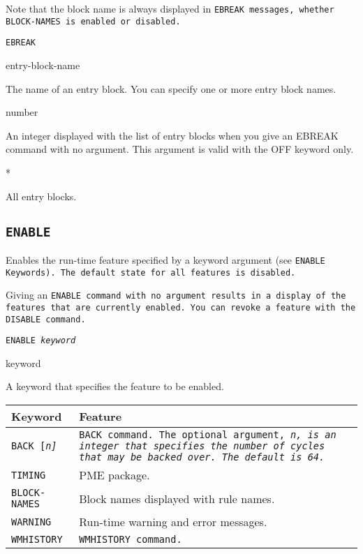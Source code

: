 Note that the block name is always displayed in \tt{EBREAK} messages,
whether \tt{BLOCK-NAMES} is enabled or disabled.

\Format

\tt{EBREAK}

\begin{arguments}
\item[entry-block-name] 

  The name of an entry block. You can specify one or more entry block
  names.

\item[number]

  An integer displayed with the list of entry blocks when you give an
  EBREAK command with no argument. This argument is valid with the OFF
  keyword only.

\item[*] 

  All entry blocks.
\end{arguments}

\subsection{\tt{ENABLE}}

Enables the run-time feature specified by a keyword argument (see
\tt{ENABLE} Keywords). The default state for all features is disabled.

Giving an \tt{ENABLE} command with no argument results in a display of
the features that are currently enabled. You can revoke a feature with
the \tt{DISABLE} command.

\Format

\tt{ENABLE} \it{keyword}

\begin{arguments}

\item[keyword]

  A keyword that specifies the feature to be enabled.
\end{arguments}

\begin{tabularx}{\columnwidth}{lX}
  \toprule
  Keyword     & Feature \\
  \midrule
  \tt{BACK} [\it{n}] & \tt{BACK} command. The optional argument, \it{n}, is  
                       an integer that specifies the number of    
                       cycles that may be backed over. The default 
                       is 64. \\
  \tt{TIMING} &  PME package. \\
  \tt{BLOCK-NAMES} & Block names displayed with rule names. \\
  \tt{WARNING} & Run-time warning and error messages. \\
  \tt{WMHISTORY} & \tt{WMHISTORY} command. \\
  \bottomrule
\end{tabularx}


